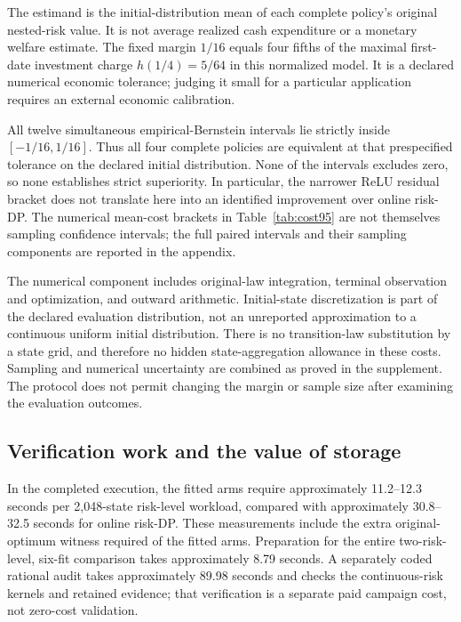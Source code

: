 
The estimand is the initial-distribution mean of each complete policy's original nested-risk value. It is not average realized cash expenditure or a monetary welfare estimate. The fixed margin $1/16$ equals four fifths of the maximal first-date investment charge $h(1/4)=5/64$ in this normalized model. It is a declared numerical economic tolerance; judging it small for a particular application requires an external economic calibration.

All twelve simultaneous empirical-Bernstein intervals lie strictly inside $[-1/16,1/16]$. Thus all four complete policies are equivalent at that prespecified tolerance on the declared initial distribution. None of the intervals excludes zero, so none establishes strict superiority. In particular, the narrower ReLU residual bracket does not translate here into an identified improvement over online risk-DP. The numerical mean-cost brackets in Table~\ref{tab:cost95} are not themselves sampling confidence intervals; the full paired intervals and their sampling components are reported in the appendix.

The numerical component includes original-law integration, terminal observation and optimization, and outward arithmetic. Initial-state discretization is part of the declared evaluation distribution, not an unreported approximation to a continuous uniform initial distribution. There is no transition-law substitution by a state grid, and therefore no hidden state-aggregation allowance in these costs. Sampling and numerical uncertainty are combined as proved in the supplement. The protocol does not permit changing the margin or sample size after examining the evaluation outcomes.

\subsection{Verification work and the value of storage}

In the completed execution, the fitted arms require approximately 11.2--12.3 seconds per 2,048-state risk-level workload, compared with approximately 30.8--32.5 seconds for online risk-DP. These measurements include the extra original-optimum witness required of the fitted arms. Preparation for the entire two-risk-level, six-fit comparison takes approximately 8.79 seconds. A separately coded rational audit takes approximately 89.98 seconds and checks the continuous-risk kernels and retained evidence; that verification is a separate paid campaign cost, not zero-cost validation.

